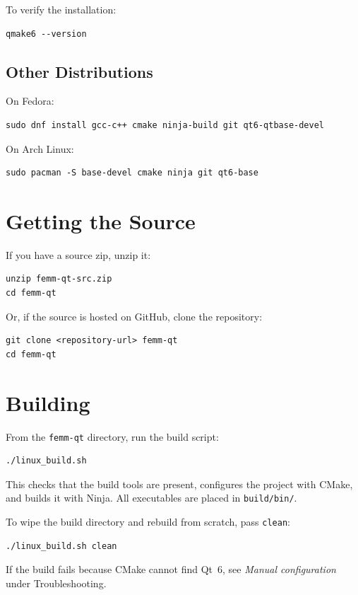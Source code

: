 \documentclass[11pt]{article}
\begin{document}
To verify the installation:
\begin{lstlisting}
qmake6 --version
\end{lstlisting}

\subsection{Other Distributions}

On Fedora:
\begin{lstlisting}
sudo dnf install gcc-c++ cmake ninja-build git qt6-qtbase-devel
\end{lstlisting}

On Arch Linux:
\begin{lstlisting}
sudo pacman -S base-devel cmake ninja git qt6-base
\end{lstlisting}

\section{Getting the Source}

If you have a source zip, unzip it:
\begin{lstlisting}
unzip femm-qt-src.zip
cd femm-qt
\end{lstlisting}

Or, if the source is hosted on GitHub, clone the repository:
\begin{lstlisting}
git clone <repository-url> femm-qt
cd femm-qt
\end{lstlisting}

\section{Building}

From the \texttt{femm-qt} directory, run the build script:
\begin{lstlisting}
./linux_build.sh
\end{lstlisting}

This checks that the build tools are present, configures the project
with CMake, and builds it with Ninja.  All executables are placed in
\texttt{build/bin/}.

To wipe the build directory and rebuild from scratch, pass
\texttt{clean}:
\begin{lstlisting}
./linux_build.sh clean
\end{lstlisting}

If the build fails because CMake cannot find Qt~6, see
\textit{Manual configuration} under Troubleshooting.
\end{document}
